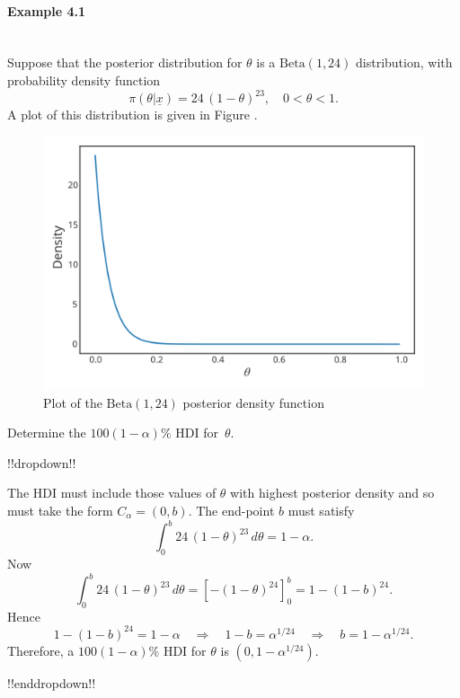 \paragraph{Example 4.1}{~\\
Suppose that the posterior distribution for $\theta$ is a
$\mathrm{Beta}(1,24)$ distribution, with probability density function
$$
\pi(\theta|\underline{x})=24\,(1-\theta)^{23}, \quad 0<\theta<1.
$$
A plot of this distribution is given in Figure .
\begin{figure}[h!]

\includegraphics{images/betaposterior.svg}
\caption{Plot of the $\mathrm{Beta}(1,24)$ posterior density function}
\label{fig:ci1}

\end{figure}
Determine the $100(1-\alpha)\%$ HDI for~$\theta$.



!!dropdown!!

The HDI must include those values of $\theta$ with highest
    posterior density and so must take the form $C_\alpha=(0,b)$. The
    end-point $b$ must satisfy
    \begin{equation*}
    \int_0^b 24\,(1-\theta)^{23}\,d\theta = 1-\alpha.
    \end{equation*}
    Now
    \begin{equation*}
    \int_0^b 24\,(1-\theta)^{23}\,d\theta 
    = \left[-(1-\theta)^{24}\right]^b_0 = 1-(1-b)^{24}.
    \end{equation*}
    Hence
    $$
    1-(1-b)^{24}=1-\alpha \quad\Longrightarrow \quad 1-b=\alpha^{1/24}
    \quad\Longrightarrow \quad b=1-\alpha^{1/24}.
    $$
    Therefore, a $100(1-\alpha)\%$ HDI for $\theta$ is
    $(0,1-\alpha^{1/24})$.

!!enddropdown!!}



